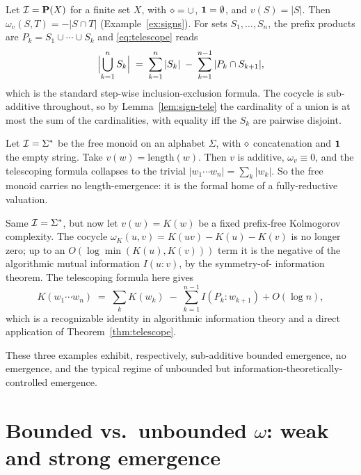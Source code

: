 \begin{example}\label{ex:tele-power}
Let $\mathcal{I} = \mathbf{P}(X)$ for a finite set $X$, with $\mathbin{\diamond} = \cup$,
$\mathbf{1} = \emptyset$, and $v(S) = |S|$. Then $\omega_v(S, T) = -|S\cap T|$
(Example~\ref{ex:signs}). For sets $S_1, \dots, S_n$, the prefix products
are $P_k = S_1 \cup \cdots \cup S_k$ and \eqref{eq:telescope} reads
\[
  \Bigl|\bigcup_{k=1}^n S_k\Bigr| \;=\; \sum_{k=1}^n |S_k| \;-\;
  \sum_{k=1}^{n-1} |P_k \cap S_{k+1}|,
\]
which is the standard step-wise inclusion-exclusion formula. The cocycle is
sub-additive throughout, so by Lemma~\ref{lem:sign-tele} the cardinality
of a union is at most the sum of the cardinalities, with equality iff the
$S_k$ are pairwise disjoint.
\end{example}

\begin{example}\label{ex:tele-free}
Let $\mathcal{I} = \Sigma^*$ be the free monoid on an alphabet $\Sigma$, with
$\mathbin{\diamond}$ concatenation and $\mathbf{1}$ the empty string. Take $v(w) =
\mathrm{length}(w)$. Then $v$ is additive, $\omega_v \equiv 0$, and the
telescoping formula collapses to the trivial $|w_1\cdots w_n| = \sum_k
|w_k|$. So the free monoid carries no length-emergence: it is the formal
home of a fully-reductive valuation.
\end{example}

\begin{example}\label{ex:tele-K}
Same $\mathcal{I} = \Sigma^*$, but now let $v(w) = K(w)$ be a fixed prefix-free
Kolmogorov complexity. The cocycle $\omega_K(u, v) = K(uv) - K(u) - K(v)$ is
no longer zero; up to an $O(\log\min(K(u), K(v)))$ term it is the negative
of the algorithmic mutual information $I(u : v)$, by the symmetry-of-
information theorem. The telescoping formula here gives
\[
  K(w_1\cdots w_n) \;=\; \sum_k K(w_k) \;-\; \sum_{k=1}^{n-1}
  I(P_k : w_{k+1}) + O(\log n),
\]
which is a recognizable identity in algorithmic information theory and a
direct application of Theorem~\ref{thm:telescope}.
\end{example}

These three examples exhibit, respectively, sub-additive bounded emergence,
no emergence, and the typical regime of unbounded but
information-theoretically-controlled emergence.

\section{Bounded vs.\ unbounded $\omega$: weak and strong emergence}
\label{sec:bounded}

